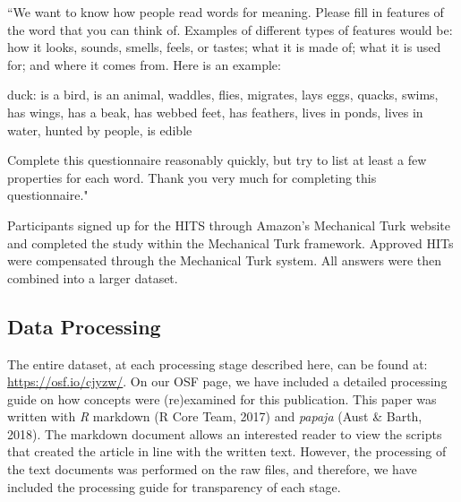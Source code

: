 \documentclass[english,,man]{apa6}
\theoremstyle{definition}
\theoremstyle{definition}
\theoremstyle{definition}
\theoremstyle{remark}
\begin{document}
``We want to know how people read words for meaning. Please fill in
features of the word that you can think of. Examples of different types
of features would be: how it looks, sounds, smells, feels, or tastes;
what it is made of; what it is used for; and where it comes from. Here
is an example:

duck: is a bird, is an animal, waddles, flies, migrates, lays eggs,
quacks, swims, has wings, has a beak, has webbed feet, has feathers,
lives in ponds, lives in water, hunted by people, is edible

Complete this questionnaire reasonably quickly, but try to list at least
a few properties for each word. Thank you very much for completing this
questionnaire."

Participants signed up for the HITS through Amazon's Mechanical Turk
website and completed the study within the Mechanical Turk framework.
Approved HITs were compensated through the Mechanical Turk system. All
answers were then combined into a larger dataset.

\subsection{Data Processing}\label{data-processing}

The entire dataset, at each processing stage described here, can be
found at: \url{https://osf.io/cjyzw/}. On our OSF page, we have included
a detailed processing guide on how concepts were (re)examined for this
publication. This paper was written with \emph{R} markdown (R Core Team,
2017) and \emph{papaja} (Aust \& Barth, 2018). The markdown document
allows an interested reader to view the scripts that created the article
in line with the written text. However, the processing of the text
documents was performed on the raw files, and therefore, we have
included the processing guide for transparency of each stage.
\end{document}
